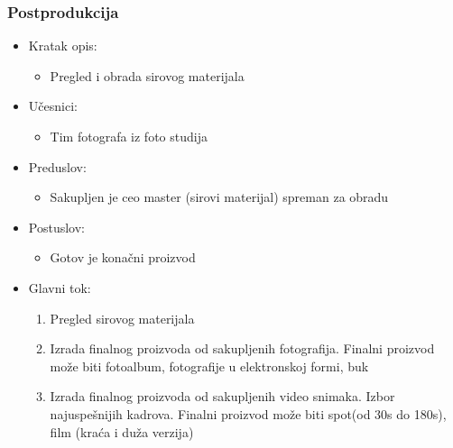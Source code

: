 \documentclass[a4paper]{article}
\begin{document}
\subsubsection{Postprodukcija}
\begin{itemize}
    \item Kratak opis: 
    \begin{itemize}
        \item Pregled i obrada sirovog materijala 
    \end{itemize}
    \item Učesnici:
        \begin{itemize}
        \item Tim fotografa iz foto studija
    \end{itemize}
    \item Preduslov:
        \begin{itemize}
            \item Sakupljen je ceo master (sirovi materijal) spreman za obradu
        \end{itemize}
    \item Postuslov:
        \begin{itemize}
            \item Gotov je konačni proizvod
            \end{itemize}
    \item Glavni tok:
        \begin{enumerate}
            \item Pregled sirovog materijala
            \item Izrada finalnog proizvoda od sakupljenih fotografija. Finalni proizvod može biti fotoalbum, fotografije u elektronskoj formi, buk
            \item Izrada finalnog proizvoda od sakupljenih video snimaka. Izbor najuspešnijih kadrova. Finalni proizvod može biti spot(od 30s do 180s), film (kraća i duža verzija)
        \end{enumerate}
\end{itemize}
\end{document}
